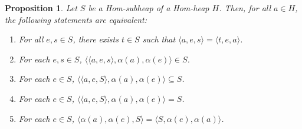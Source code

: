 \documentclass[14pt]{article}
\newtheorem{prop}[thm]{Proposition}
\theoremstyle{Definition}
\theoremstyle{remark}
\begin{document}
\begin{prop}
Let $S$ be a Hom-subheap of a Hom-heap $H$. Then, for all $a \in H$, the following statements are equivalent:
\begin{enumerate}
    \item For all $e, s \in S$, there exists $t \in S$ such that $\langle a, e, s \rangle = \langle t, e, a \rangle$.
    \item For each $e, s \in S$, $\langle \langle a, e, s \rangle, \alpha(a), \alpha(e) \rangle \in S$.
    \item For each $e \in S$, $\langle \langle a, e, S \rangle, \alpha(a), \alpha(e) \rangle \subseteq S$.
    \item For each $e \in S$, $\langle \langle a, e, S \rangle, \alpha(a), \alpha(e) \rangle = S$.
    \item For each $e \in S$, $\langle \alpha(a), \alpha(e), S \rangle = \langle S, \alpha(e), \alpha(a) \rangle$.
\end{enumerate}
\end{prop}
\end{document}
